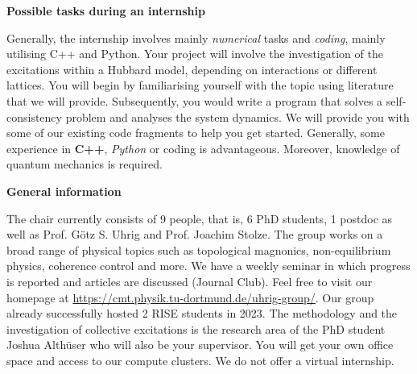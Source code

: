 \documentclass[20pt]{article}
\newcommand{\msection}[1]{ { \vspace{5mm} \hspace{-6mm} \large \textbf{#1}} \vspace{2mm} } %
\begin{document}
\msection{Possible tasks during an internship}

Generally, the internship involves mainly \emph{numerical} tasks and \emph{coding}, mainly utilising C++ and Python.
Your project will involve the investigation of the excitations within a Hubbard model, depending on interactions or different lattices.
You will begin by familiarising yourself with the topic using literature that we will provide.
Subsequently, you would write a program that solves a self-consistency problem and analyses the system dynamics.
We will provide you with some of our existing code fragments to help you get started.
Generally, some experience in \textbf{C++}, \emph{Python} or coding is advantageous. Moreover, knowledge of quantum mechanics is required.


\msection{General information}

The chair currently consists of 9 people, that is, 6 PhD students, 1 postdoc as well as Prof. G\"otz S. Uhrig and Prof. Joachim Stolze. 
The group works on a broad range of physical topics such as topological magnonics, non-equilibrium physics, coherence control and more. 
We have a weekly seminar in which progress is reported and articles are discussed (Journal Club). Feel free to visit our homepage at \url{https://cmt.physik.tu-dortmund.de/uhrig-group/}. 
Our group already successfully hosted 2 RISE students in 2023.
The methodology and the investigation of collective excitations is the research area of the PhD student Joshua Alth\"user who will also be your supervisor.
You will get your own office space and access to our compute clusters. We do not offer a virtual internship.

 

\end{document}
